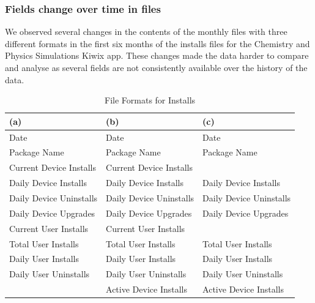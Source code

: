 \subsubsection{Fields change over time in files}
We observed several changes in the contents of the monthly files with three different formats in the first six months of the installs files for the Chemistry and Physics Simulations Kiwix app. These changes made the data harder to compare and analyse as several fields are not consistently available over the history of the data.
\begin{table}[htbp!]
    \centering
    \footnotesize
    \begin{tabular}{lll}
    (a) &(b) &(c)\\
    \hline
    Date &Date &Date\\
    Package Name &Package Name &Package Name\\
    Current Device Installs &Current Device Installs &\\
    Daily Device Installs &Daily Device Installs &Daily Device Installs\\
    Daily Device Uninstalls &Daily Device Uninstalls &Daily Device Uninstalls\\
    Daily Device Upgrades &Daily Device Upgrades &Daily Device Upgrades\\
    Current User Installs &Current User Installs &\\
    Total User Installs &Total User Installs &Total User Installs\\
    Daily User Installs &Daily User Installs &Daily User Installs\\
    Daily User Uninstalls &Daily User Uninstalls &Daily User Uninstalls\\
                          &Active Device Installs &Active Device Installs\\
    \end{tabular}
    \caption{File Formats for Installs}
    \label{tab:file_formats_for_installs}
\end{table}

